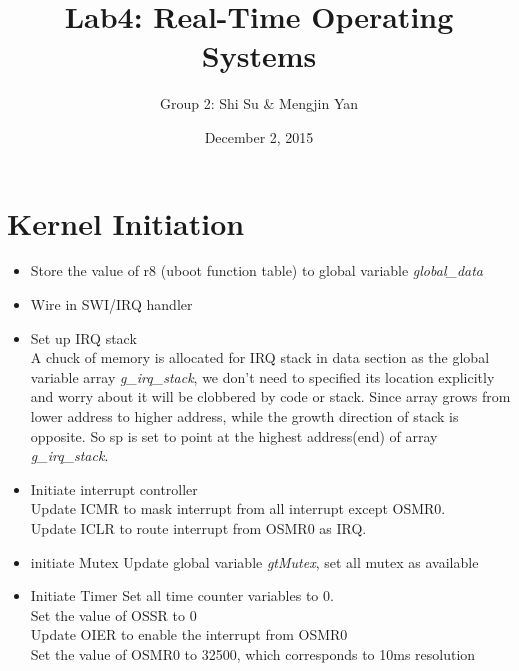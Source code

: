 \documentclass{article}
\title{\bf{ Lab4: Real-Time Operating Systems} }
\author{Group 2: Shi Su \& Mengjin Yan}
\date{December 2, 2015}
\begin{document}
 
\maketitle
 
\tableofcontents

\newpage


% 
  

\section{Kernel Initiation}
\begin{itemize}
	\setlength{\itemsep}{1pt}
	\setlength{\parskip}{0pt}
	\setlength{\parsep}{0pt}
	\item Store the value of r8 (uboot function table) to global variable {\it global\_data}
	\item Wire in SWI/IRQ handler
	\item Set up IRQ stack\\
		A chuck of memory is allocated for IRQ stack in data section as the global variable array {\it g\_irq\_stack}, we don't need to specified its location explicitly and worry about it will be clobbered by code or stack. Since array grows from lower address to higher address, while the growth direction of stack is opposite. So sp is set to point at the highest address(end) of array {\it g\_irq\_stack}. 
	\smallskip
	\item Initiate interrupt controller\\
		Update ICMR to mask interrupt from all interrupt except OSMR0.\\
		Update ICLR to route interrupt from OSMR0 as IRQ.
		\smallskip
	\item initiate Mutex
		Update global variable {\it gtMutex}, set all mutex as available
		\smallskip
	\item Initiate Timer
		Set all time counter variables to 0.\\
		Set the value of OSSR to 0\\
		Update OIER to enable the interrupt from OSMR0\\
		Set the value of OSMR0 to 32500, which corresponds to 10ms resolution\\
\end{itemize}
\end{document}
